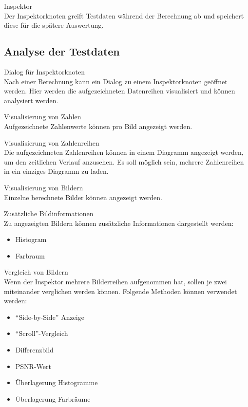 \begin{speclist}[F]
\setcounter{specnum}{23010}

\spec Inspektor \\
Der Inspektorknoten greift Testdaten während der Berechnung ab und speichert diese für die spätere Auswertung.

\end{speclist}

\subsection{Analyse der Testdaten}

\begin{speclist}[F]
\setcounter{specnum}{31010}

\spec Dialog für Inspektorknoten \\
Nach einer Berechnung kann ein Dialog zu einem Inspektorknoten geöffnet werden. Hier werden die aufgezeichneten Datenreihen visualisiert und können analysiert werden.

\spec Visualisierung von Zahlen \\
Aufgezeichnete Zahlenwerte können pro Bild angezeigt werden.

\spec Visualisierung von Zahlenreihen \\
Die aufgezeichneten Zahlenreihen können in einem Diagramm angezeigt werden, um den zeitlichen Verlauf anzusehen. Es soll möglich sein, mehrere Zahlenreihen in ein einziges Diagramm zu laden.

\spec Visualisierung von Bildern \\
Einzelne berechnete Bilder können angezeigt werden.

\spec Zusätzliche Bildinformationen \\
Zu angezeigten Bildern können zusätzliche Informationen dargestellt werden:
\begin{itemize}
	\item Histogram
	\item Farbraum
\end{itemize}

\spec Vergleich von Bildern \\
Wenn der Inspektor mehrere Bilderreihen aufgenommen hat, sollen je zwei miteinander verglichen werden können. Folgende Methoden können verwendet werden:
\begin{itemize}
	\item "`Side-by-Side"' Anzeige
	\item "`Scroll"'-Vergleich
	\item Differenzbild
	\item PSNR-Wert
	\item Überlagerung Histogramme
	\item Überlagerung Farbräume
\end{itemize}


\end{speclist}
